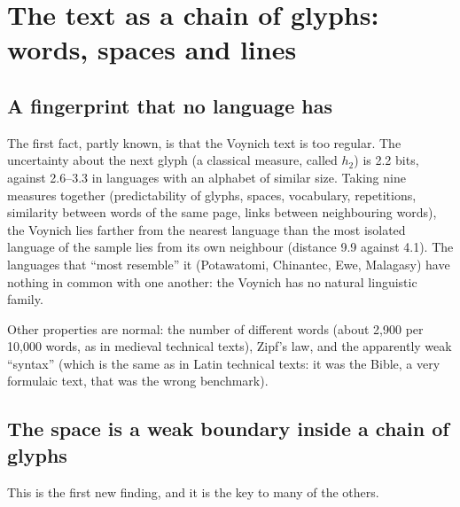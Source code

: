 \section{The text as a chain of glyphs: words, spaces and lines}

\subsection{A fingerprint that no language has}

The first fact, partly known, is that the Voynich text is too regular. The uncertainty about the next glyph (a classical
measure, called $h_2$) is 2.2 bits, against 2.6--3.3 in languages with an alphabet of similar size. Taking nine measures
together (predictability of glyphs, spaces, vocabulary, repetitions, similarity between words of the same page, links
between neighbouring words), the Voynich lies farther from the nearest language than the most isolated language of the
sample lies from its own neighbour (distance 9.9 against 4.1). The languages that ``most resemble'' it (Potawatomi,
Chinantec, Ewe, Malagasy) have nothing in common with one another: the Voynich has no natural linguistic family.

Other properties are normal: the number of different words (about 2{,}900 per 10{,}000 words, as in medieval technical
texts), Zipf's law, and the apparently weak ``syntax'' (which is the same as in Latin technical texts: it was the Bible,
a very formulaic text, that was the wrong benchmark).

\subsection{The space is a weak boundary inside a chain of glyphs}

This is the first new finding, and it is the key to many of the others.

